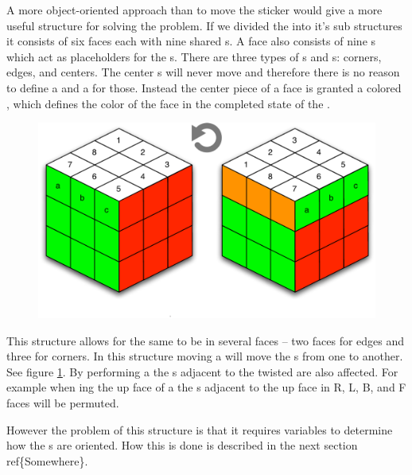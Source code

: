 A more object-oriented approach than to move the sticker would give a more useful structure for solving the problem.
If we divided the \rubik{} into it's sub structures it consists of six faces each with nine shared \cubie{}s.
A face also consists of nine \cubicle{}s which act as placeholders for the \cpiece{}s. 
There are three types of \cpiece{}s and \cubicle{}s: corners, edges, and centers. 
The center \cpiece{}s will never move and therefore there is no reason to define a \cubicle{} and a \cpiece{} for those. Instead the center piece of a face is granted a colored \facelet{}, which defines the color of the face in the completed state of the \rubik{}.
\begin{figure}[h]
	\centering
		\includegraphics[scale=0.6]{input/pics/twistOfUpFace.pdf}
	\caption{}
	\label{fig:twistOfUpFace}
\end{figure}
This structure allows for the same \cubicle{} to be in several faces -- two faces for edges and three for corners. 
In this structure moving a \face{} will move the \cpiece{}s from one \cubicle{} to another. See figure \ref{fig:twistOfUpFace}. By performing a \twist{} the \face{}s adjacent to the twisted \face{} are also affected. 
For example when \twist{}ing the up face of a \rubik{} the \cubie{}s adjacent to the up face in R, L, B, and F faces will be permuted.

However the problem of this structure is that it requires variables to determine how the \cubie{}s are oriented. 
How this is done is described in the next section ref\{Somewhere\}.

